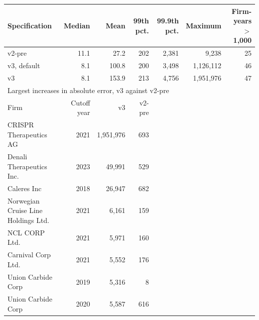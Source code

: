 \begin{tabular}{lrrrrrr}
\toprule
Specification & Median & Mean & 99th pct. & 99.9th pct. & Maximum & Firm-years $>$ 1{,}000 \\
\midrule
v2-pre & 11.1 & 27.2 & 202 & 2{,}381 & 9{,}238 & 25 \\
v3, default & 8.1 & 100.8 & 200 & 3{,}498 & 1{,}126{,}112 & 46 \\
v3 & 8.1 & 153.9 & 213 & 4{,}756 & 1{,}951{,}976 & 47 \\
\midrule
\multicolumn{7}{l}{Largest increases in absolute error, v3 against v2-pre} \\
Firm & Cutoff year & v3 & v2-pre & & & \\
\midrule
CRISPR Therapeutics AG & 2021 & 1{,}951{,}976 & 693 & & & \\
Denali Therapeutics Inc. & 2023 & 49{,}991 & 529 & & & \\
Caleres Inc & 2018 & 26{,}947 & 682 & & & \\
Norwegian Cruise Line Holdings Ltd. & 2021 & 6{,}161 & 159 & & & \\
NCL CORP Ltd. & 2021 & 5{,}971 & 160 & & & \\
Carnival Corp Ltd. & 2021 & 5{,}552 & 176 & & & \\
Union Carbide Corp & 2019 & 5{,}316 & 8 & & & \\
Union Carbide Corp & 2020 & 5{,}587 & 616 & & & \\
\bottomrule
\end{tabular}
